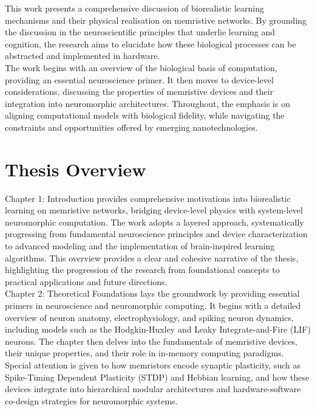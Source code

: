 \noindent This work presents a comprehensive discussion of biorealistic learning mechanisms and their physical realisation on memristive networks. By grounding the discussion in the neuroscientific principles that underlie learning and cognition, the research aims to elucidate how these biological processes can be abstracted and implemented in hardware. \\

\noindent The work begins with an overview of the biological basis of computation, providing an essential neuroscience primer. It then moves to device-level considerations, discussing the properties of memristive devices and their integration into neuromorphic architectures. Throughout, the emphasis is on aligning computational models with biological fidelity, while navigating the constraints and opportunities offered by emerging nanotechnologies.

\section[Thesis Overview]{Thesis Overview}

Chapter 1: Introduction provides comprehensive motivations into biorealistic learning on memristive networks, bridging device-level physics with system-level neuromorphic computation. The work adopts a layered approach, systematically progressing from fundamental neuroscience principles and device characterization to advanced modeling and the implementation of brain-inspired learning algorithms. This overview provides a clear and cohesive narrative of the thesis, highlighting the progression of the research from foundational concepts to practical applications and future directions.\\

\noindent Chapter 2: Theoretical Foundations lays the groundwork by providing essential primers in neuroscience and neuromorphic computing. It begins with a detailed overview of neuron anatomy, electrophysiology, and spiking neuron dynamics, including models such as the Hodgkin-Huxley and Leaky Integrate-and-Fire (LIF) neurons. The chapter then delves into the fundamentals of memristive devices, their unique properties, and their role in in-memory computing paradigms. Special attention is given to how memristors encode synaptic plasticity, such as Spike-Timing Dependent Plasticity (STDP) and Hebbian learning, and how these devices integrate into hierarchical modular architectures and hardware-software co-design strategies for neuromorphic systems.\\

